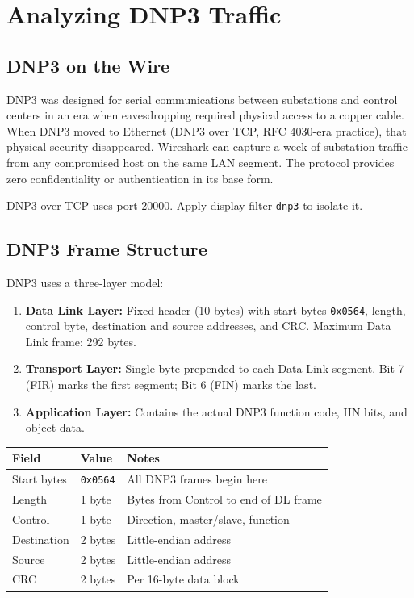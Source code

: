 \documentclass[12pt,twoside,openright]{memoir}
\newcommand{\filter}[1]{\texttt{\color{wsblue}#1}}
\newcommand{\hex}[1]{\texttt{0x#1}}
\begin{document}
\chapter{Analyzing DNP3 Traffic}

\section{DNP3 on the Wire}

DNP3 was designed for serial communications between substations and control centers in an era when eavesdropping required physical access to a copper cable. When DNP3 moved to Ethernet (DNP3 over TCP, RFC 4030-era practice), that physical security disappeared. Wireshark can capture a week of substation traffic from any compromised host on the same LAN segment. The protocol provides zero confidentiality or authentication in its base form.

DNP3 over TCP uses port 20000. Apply display filter \filter{dnp3} to isolate it.

\section{DNP3 Frame Structure}

DNP3 uses a three-layer model:
\begin{enumerate}[noitemsep]
  \item \textbf{Data Link Layer:} Fixed header (10 bytes) with start bytes \hex{0564}, length, control byte, destination and source addresses, and CRC. Maximum Data Link frame: 292 bytes.
  \item \textbf{Transport Layer:} Single byte prepended to each Data Link segment. Bit 7 (FIR) marks the first segment; Bit 6 (FIN) marks the last.
  \item \textbf{Application Layer:} Contains the actual DNP3 function code, IIN bits, and object data.
\end{enumerate}

\begin{center}
\begin{tabular}{L{3.5cm}L{3cm}L{5cm}}
\toprule
{}
\textbf{Field} & \textbf{Value} & \textbf{Notes} \\
\midrule
Start bytes & \hex{0564} & All DNP3 frames begin here \\
Length & 1 byte & Bytes from Control to end of DL frame \\
Control & 1 byte & Direction, master/slave, function \\
Destination & 2 bytes & Little-endian address \\
Source & 2 bytes & Little-endian address \\
CRC & 2 bytes & Per 16-byte data block \\
\bottomrule
\end{tabular}
\end{center}
\end{document}
